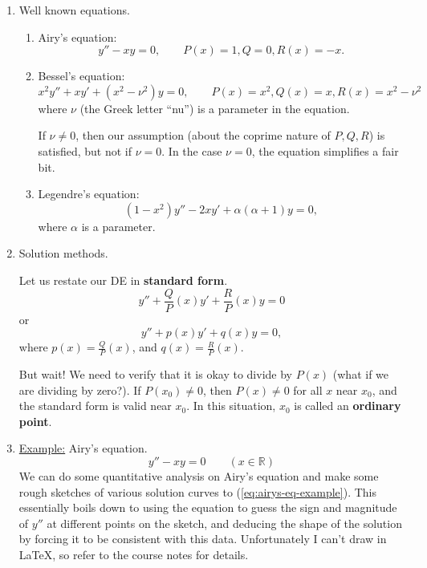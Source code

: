 \documentclass[11pt, letterpaper, oneside]{article}     %
\numberwithin{equation}{subsection}
\theoremstyle{definition}
\numberwithin{theorem}{section}
\theoremstyle{remark}
\newcommand{\RR}{\mathbb{R}}
\begin{document}
\begin{enumerate}
\item Well known equations.
  \begin{enumerate}
  \item Airy's equation:
    \begin{equation}
      y'' - xy = 0,\quad\quad P(x) = 1, Q = 0, R(x) = -x.
    \end{equation}
  \item Bessel's equation:
    \begin{equation}
      x^2y'' + xy' + (x^2 - \nu^2)y = 0,\quad\quad P(x) = x^2, Q(x) = x, R(x) = x^2 - \nu^2
    \end{equation}
    where $\nu$ (the Greek letter ``nu'') is a parameter in the equation.

    If $\nu \neq 0$, then our assumption (about the coprime nature of $P,Q,R$) is satisfied, but not if $\nu = 0$. In the case $\nu = 0$, the equation simplifies a fair bit.

  \item Legendre's equation:
    \begin{equation}
      (1 - x^2)y'' - 2xy' + \alpha(\alpha + 1)y = 0,
    \end{equation}
    where $\alpha$ is a parameter.

  \end{enumerate}

\item Solution methods.

  Let us restate our DE in \textbf{standard form}.
  \begin{equation}
    y'' + \frac{Q}{P}(x)y' + \frac{R}{P}(x)y = 0
  \end{equation}
  or
  \begin{equation}
    y'' + p(x)y' + q(x)y = 0,
  \end{equation}
  where $p(x) = \frac{Q}{P}(x)$, and $q(x) = \frac{R}{P}(x)$.

  But wait! We need to verify that it is okay to divide by $P(x)$ (what if we are dividing by zero?). If $P(x_0) \neq 0$, then $P(x) \neq 0$ for all $x$ near $x_0$, and the standard form is valid near $x_0$. In this situation, $x_0$ is called an \textbf{ordinary point}.

\item \underline{Example:} Airy's equation.
  \begin{equation}\label{eq:airys-eq-example}
    y'' - xy = 0 \quad\quad (x\in\RR)
  \end{equation}
  We can do some quantitative analysis on Airy's equation and make some rough sketches of various solution curves to (\ref{eq:airys-eq-example}). This essentially boils down to using the equation to guess the sign and magnitude of $y''$ at different points on the sketch, and deducing the shape of the solution by forcing it to be consistent with this data. Unfortunately I can't draw in \LaTeX, so refer to the course notes for details.


\end{enumerate}
\end{document}
